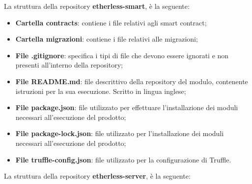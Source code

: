 			La struttura della repository \textbf{etherless-smart}, è la seguente:
			\begin{itemize}
				\item \textbf{Cartella contracts}: contiene i file relativi agli smart contract;
				\item \textbf{Cartella migrazioni}: contiene i file relativi alle migrazioni;
				\item \textbf{File .gitignore}: specifica i tipi di file che devono essere ignorati e non presenti all'interno della repository;
				\item \textbf{File README.md}: file descrittivo della repository del modulo, contenente istruzioni per la sua esecuzione. Scritto in lingua inglese;
				\item \textbf{File package.json}: file utilizzato per effettuare l'installazione dei moduli necessari all'esecuzione del prodotto;
				\item \textbf{File package-lock.json}: file utilizzato per l'installazione dei moduli necessari all'esecuzione del prodotto;
				\item \textbf{File truffle-config.json}: file utilizzato per la configurazione di Truffle.
			\end{itemize}
			La struttura della repository \textbf{etherless-server}, è la seguente:
